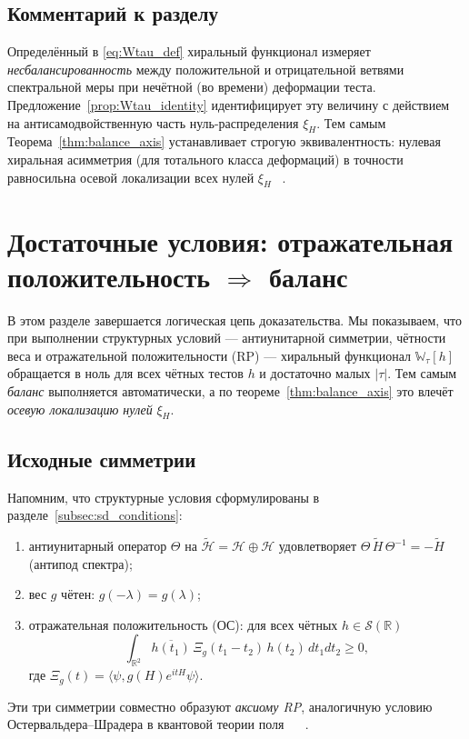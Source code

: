 \documentclass{article}
\numberwithin{equation}{section}
\theoremstyle{plain}
\theoremstyle{definition}
\theoremstyle{remark}
\def\Rightarrow{⇒}%
\begin{document}
\subsection{Комментарий к разделу}
\label{subsec:summary7}

Определённый в \eqref{eq:Wtau_def} хиральный функционал измеряет \emph{несбалансированность}
между положительной и отрицательной ветвями спектральной меры при нечётной (во времени) деформации теста.
Предложение~\ref{prop:Wtau_identity} идентифицирует эту величину с действием на антисамодвойственную
часть нуль-распределения $\xi_H$. Тем самым Теорема~\ref{thm:balance_axis} устанавливает
строгую эквивалентность: нулевая хиральная асимметрия (для тотального класса деформаций)
в точности равносильна осевой локализации всех нулей $\xi_H$ ~\cite{Connes1999}.

\clearpage

\section{Достаточные условия: отражательная положительность $\Rightarrow$ баланс}
\label{sec:RP_balance}

В этом разделе завершается логическая цепь доказательства.
Мы показываем, что при выполнении структурных условий --- антиунитарной симметрии, чётности веса и отражательной положительности (RP) --- хиральный функционал $\mathbb W_\tau[h]$ обращается в ноль для всех чётных тестов $h$ и достаточно малых $|\tau|$.  
Тем самым \emph{баланс} выполняется автоматически, а по теореме~\ref{thm:balance_axis} это влечёт \emph{осевую локализацию нулей} $\xi_H$.

\subsection{Исходные симметрии}
\label{subsec:structural_symmetries}

Напомним, что структурные условия сформулированы в разделе~\ref{subsec:sd_conditions}:
\begin{enumerate}[label=(\roman*),leftmargin=2.4em]
  \item антиунитарный оператор $\Theta$ на $\widetilde{\mathcal H}=\mathcal H\oplus\mathcal H$ удовлетворяет
  $\Theta\,\widetilde H\,\Theta^{-1}=-\widetilde H$ (антипод спектра);
  \item вес $g$ чётен: $g(-\lambda)=g(\lambda)$;
  \item отражательная положительность (ОС): для всех чётных $h\in\mathcal S(\mathbb R)$
  \begin{equation}
  \label{eq:RP_axiom}
  \int_{\mathbb R^2}\overline{h(t_1)}\,\Xi_g(t_1-t_2)\,h(t_2)\,dt_1dt_2\ge0,
  \end{equation}
  где $\Xi_g(t)=\langle\psi,g(H)e^{itH}\psi\rangle$.
\end{enumerate}
Эти три симметрии совместно образуют \emph{аксиому RP}, аналогичную условию Остервальдера–Шрадера в квантовой теории поля ~\cite{OsterwalderSchrader1973} ~\cite{Simon1974}.
\end{document}
